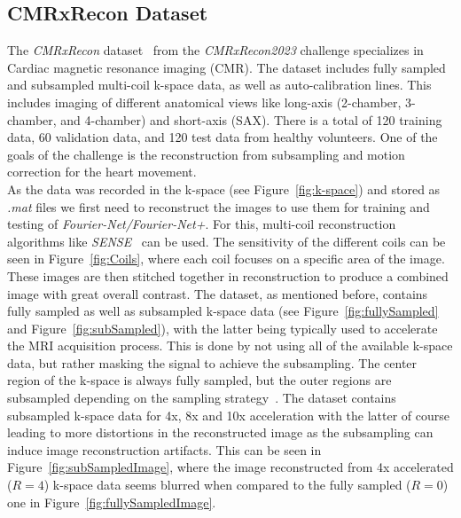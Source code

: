 \documentclass[english,version-2022-01]{uzl-thesis} %
\begin{document}
\subsection{CMRxRecon Dataset} \label{SubSec:CMRxRecon}
The \emph{CMRxRecon} dataset~\cite{CMRxRecon} from the \emph{CMRxRecon2023} challenge specializes in Cardiac magnetic resonance imaging (CMR). The dataset includes 
fully sampled and subsampled multi-coil k-space data, as well as auto-calibration lines. This includes imaging of different anatomical views like long-axis (2-chamber, 3-chamber, and 4-chamber) and short-axis (SAX). There is a total of 120 training data, 60 validation data, and 120 test data from healthy volunteers. One of the goals of the challenge is the reconstruction from subsampling and motion correction for the heart movement.\\
As the data was recorded in the k-space (see Figure~\ref{fig:k-space}) and stored as \emph{.mat} files we first need to reconstruct the images to use them for training and testing of \emph{Fourier-Net/Fourier-Net+}. For this, multi-coil reconstruction algorithms like \emph{SENSE}~\cite{SENSE1} can be used. The sensitivity of the different coils can be seen in Figure~\ref{fig:Coils}, where each coil focuses on a specific area of the image. These images are then stitched together in reconstruction to produce a combined image with great overall contrast.
The dataset, as mentioned before, contains fully sampled as well as subsampled k-space data (see Figure~\ref{fig:fullySampled} and Figure~\ref{fig:subSampled}), with the latter being typically used to accelerate the MRI acquisition process. This is done by not using all of the available k-space data, but rather masking the signal to achieve the subsampling. The center region of the k-space is always fully sampled, but the outer regions are subsampled depending on the sampling strategy~\cite{SamplingStrategies}. The dataset contains subsampled k-space data for 4x, 8x and 10x acceleration with the latter of course leading to more distortions in the reconstructed image as the subsampling can induce image reconstruction artifacts. This can be seen in Figure~\ref{fig:subSampledImage}, where the image reconstructed from 4x accelerated ($R=4$) k-space data seems blurred when compared to the fully sampled ($R=0$) one in Figure~\ref{fig:fullySampledImage}. 
\end{document}
